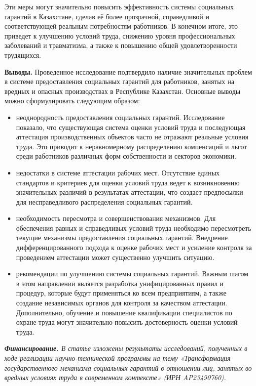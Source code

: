 \begin{multicols}{2}
Эти меры могут значительно повысить эффективность системы социальных
гарантий в Казахстане, сделав её более прозрачной, справедливой и
соответствующей реальным потребностям работников. В конечном итоге, это
приведет к улучшению условий труда, снижению уровня профессиональных
заболеваний и травматизма, а также к повышению общей удовлетворенности
трудящихся.

{\bfseries Выводы.} Проведенное исследование подтвердило наличие
значительных проблем в системе предоставления социальных гарантий для
работников, занятых на вредных и опасных производствах в Республике
Казахстан. Основные выводы можно сформулировать следующим образом:

\begin{itemize}
\item
  неоднородность предоставления социальных гарантий. Исследование
  показало, что существующая система оценки условий труда и последующая
  аттестация производственных объектов часто не отражают реальные
  условия труда. Это приводит к неравномерному распределению компенсаций
  и льгот среди работников различных форм собственности и секторов
  экономики.
\item
  недостатки в системе аттестации рабочих мест. Отсутствие единых
  стандартов и критериев для оценки условий труда ведет к возникновению
  значительных различий в результатах аттестации, что создает
  предпосылки для несправедливого распределения социальных гарантий.
\item
  необходимость пересмотра и совершенствования механизмов. Для
  обеспечения равных и справедливых условий труда необходимо
  пересмотреть текущие механизмы предоставления социальных гарантий.
  Внедрение дифференцированного подхода к оценке рабочих мест и усиление
  контроля за проведением аттестации может существенно улучшить
  ситуацию.
\item
  рекомендации по улучшению системы социальных гарантий. Важным шагом в
  этом направлении является разработка унифицированных правил и
  процедур, которые будут применяться ко всем предприятиям, а также
  создание независимых органов для контроля за качеством аттестации.
  Дополнительно, обучение и повышение квалификации специалистов по
  охране труда могут значительно повысить достоверность оценки условий
  труда.
\end{itemize}

\emph{{\bfseries Финансирование.} В статье изложены результаты
исследований, полученных в ходе реализации научно-технической программы
на тему «Трансформация государственного механизма социальных гарантий в
отношении лиц, занятых во вредных условиях труда в современном
контексте» (ИРН AP23490760).}
\end{multicols}

